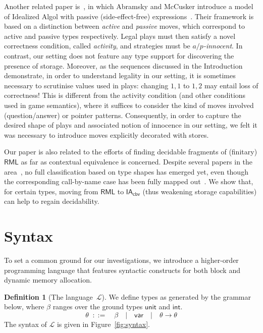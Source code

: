 \documentclass{CSML}
\theoremstyle{definition}\newtheorem{definition}[thm]{Definition}
\theoremstyle{definition}\newtheorem{example}[thm]{Example}
\theoremstyle{definition}\newtheorem{proposition}[thm]{Proposition}
\theoremstyle{definition}\newtheorem{lemma}[thm]{Lemma}
\theoremstyle{definition}\newtheorem{theorem}[thm]{Theorem}
\theoremstyle{definition}\newtheorem{corollary}[thm]{Corollary}
\theoremstyle{definition}\newtheorem{remark}[thm]{Remark}
\newcommand\nt[1]{#1}
\newcommand\iacbv{\mathsf{IA}_{\mathsf{cbv}}}
\newcommand\rml{\mathsf{RML}}
\newcommand\comt{\mathsf{unit}}
\newcommand\expt{\mathsf{int}}
\newcommand\vart{\mathsf{var}}
\newcommand{\rarr}{\rightarrow}
\newcommand\lang{\mathcal{L}}
\begin{document}
\nt{Another related paper is~\cite{AM99a}, in which Abramsky and McCusker introduce a model of
Idealized Algol with passive (side-effect-free) expressions~\cite{AM99a}.
Their framework is based on a distinction between \emph{active} and \emph{passive} moves, which correspond
to active and passive types respectively. Legal plays must then satisfy a novel correctness condition, called  \emph{activity}, 
and strategies must be \emph{$a/p$-innocent}. In contrast, our setting does not feature any type support for 
discovering the presence of storage. Moreover, as the sequences discussed in the Introduction demonstrate,
in order to understand legality in our setting, it is sometimes necessary to scrutinise values used in plays:
changing $1,1$ to $1,2$ may entail loss of correctness!
This is different from the activity condition (and other conditions used in game semantics), where it suffices
to consider the kind of moves involved (question/answer) or pointer patterns. 
Consequently, in order to capture the desired
shape of plays and associated notion of innocence in our setting,  
we felt it was necessary to  introduce moves explicitly decorated with stores.}

Our paper is also related to the efforts of finding decidable fragments of (finitary) $\rml$ as far as contextual equivalence is concerned.
Despite several papers in the area~\cite{Ghi01, Mur04b, HMO11,CBHMO15}, no full classification based on type shapes has emerged yet, even though
the corresponding call-by-name case has been fully mapped
out~\cite{MOW05}. We show that, for certain types, moving from $\rml$
to $\iacbv$ (thus weakening storage capabilities) can help to regain
decidability.



\section{Syntax\label{sec:syntax}}

To set a common ground for our investigations, we introduce a higher-order 
programming language that features syntactic constructs for both
block and dynamic memory allocation. 

\begin{definition}[The language~$\lang$]
We define types as generated by the grammar below,
where $\beta$ ranges over the ground types $\comt$ and $\expt$.
\[
\theta\;\; ::= \quad \beta \quad|\quad \vart\quad | \quad \theta\rarr\theta
\]
The syntax of $\lang$ is given in Figure~\ref{fig:syntax}. 
\end{definition}
\end{document}
